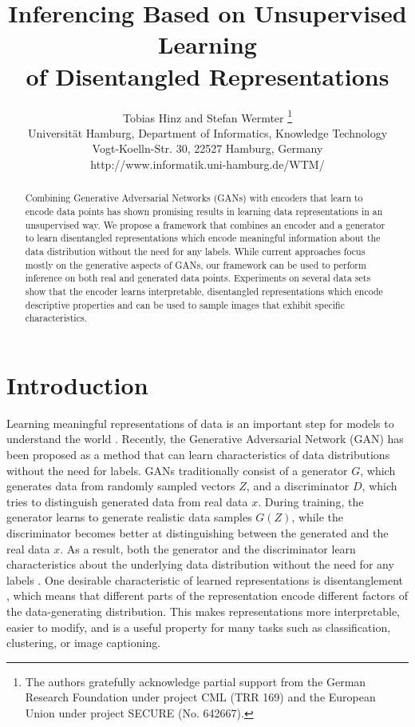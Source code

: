 \documentclass{esannV2}
\begin{document}
\title{Inferencing Based on Unsupervised Learning\\of Disentangled Representations}

\author{Tobias Hinz and Stefan Wermter
\thanks{The authors gratefully acknowledge partial support from the German Research Foundation under project CML (TRR 169) and the European Union under project SECURE (No. 642667).}
\vspace{.3cm}\\
Universit\"at Hamburg, Department of Informatics, Knowledge Technology \\
Vogt-Koelln-Str. 30, 22527 Hamburg, Germany \\
http://www.informatik.uni-hamburg.de/WTM/
}


\maketitle

\begin{abstract}
Combining Generative Adversarial Networks (GANs) with encoders that learn to encode data points has shown promising results in learning data representations in an unsupervised way. We propose a framework that combines an encoder and a generator to learn disentangled representations which encode meaningful information about the data distribution without the need for any labels. While current approaches focus mostly on the generative aspects of GANs, our framework can be used to perform inference on both real and generated data points. Experiments on several data sets show that the encoder learns interpretable, disentangled representations which encode descriptive properties and can be used to sample images that exhibit specific characteristics.
\end{abstract}

\section{Introduction}
Learning meaningful representations of data is an important step for models to understand the world \cite{Bengio2013}. Recently, the Generative Adversarial Network (GAN) \cite{Goodfellow2014} has been proposed as a method that can learn characteristics of data distributions without the need for labels. GANs traditionally consist of a generator $G$, which generates data from randomly sampled vectors $Z$, and a discriminator $D$, which tries to distinguish generated data from real data $x$. During training, the generator learns to generate realistic data samples $G(Z)$, while the discriminator becomes better at distinguishing between the generated and the real data $x$. As a result, both the generator and the discriminator learn characteristics about the underlying data distribution without the need for any labels \cite{Radford2015}.
One desirable characteristic of learned representations is disentanglement \cite{Bengio2013}, which means that different parts of the representation encode different factors of the data-generating distribution. This makes representations more interpretable, easier to modify, and is a useful property for many tasks such as classification, clustering, or image captioning.
\end{document}
